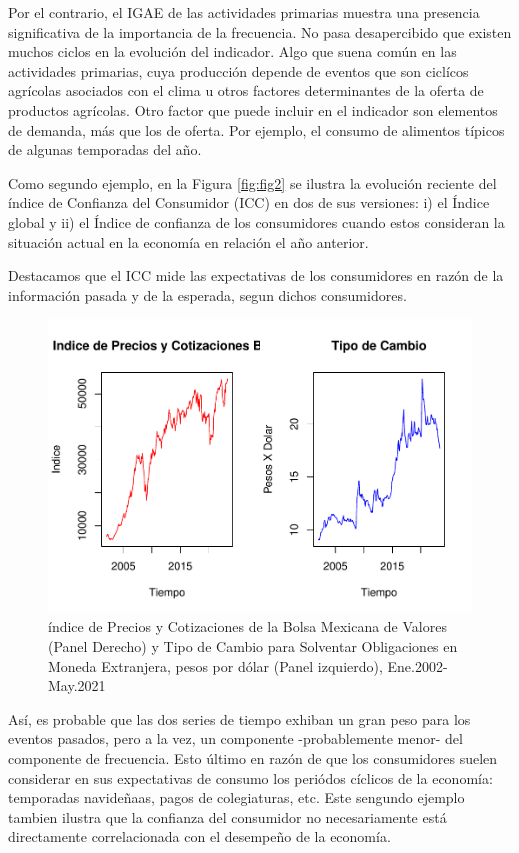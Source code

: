 \documentclass[
]{book}
\begin{document}
Por el contrario, el IGAE de las actividades primarias muestra una presencia
significativa de la importancia de la frecuencia. No pasa desapercibido que
existen muchos ciclos en la evolución del indicador. Algo que suena común
en las actividades primarias, cuya producción depende de eventos que son
ciclícos agrícolas asociados con el clima u otros factores determinantes de la
oferta de productos agrícolas. Otro factor que puede incluir en el indicador
son elementos de demanda, más que los de oferta. Por ejemplo, el consumo
de alimentos típicos de algunas temporadas del año.

Como segundo ejemplo, en la Figura \ref{fig:fig2} se ilustra la evolución reciente del índice de Confianza del Consumidor (ICC) en dos de sus versiones: i) el Índice global y ii) el Índice de confianza de los consumidores cuando estos consideran la situación actual en la economía en relación el año anterior.

Destacamos que el ICC mide las expectativas de los consumidores en
razón de la información pasada y de la esperada, segun dichos consumidores.

\begin{figure}

{\centering \includegraphics{bookdown-demo_files/figure-latex/fig3-1} 

}

\caption{índice de Precios y Cotizaciones de la Bolsa Mexicana de Valores (Panel Derecho) y Tipo de Cambio para Solventar Obligaciones en Moneda Extranjera, pesos por dólar (Panel izquierdo), Ene.2002-May.2021 }\label{fig:fig3}
\end{figure}

Así, es probable que las dos series de tiempo exhiban un gran peso para los
eventos pasados, pero a la vez, un componente -probablemente menor- del
componente de frecuencia. Esto último en razón de que los consumidores
suelen considerar en sus expectativas de consumo los periódos cíclicos de la
economía: temporadas navideñaas, pagos de colegiaturas, etc. Este sengundo
ejemplo tambien ilustra que la confianza del consumidor no necesariamente
está directamente correlacionada con el desempeño de la economía.
\end{document}
